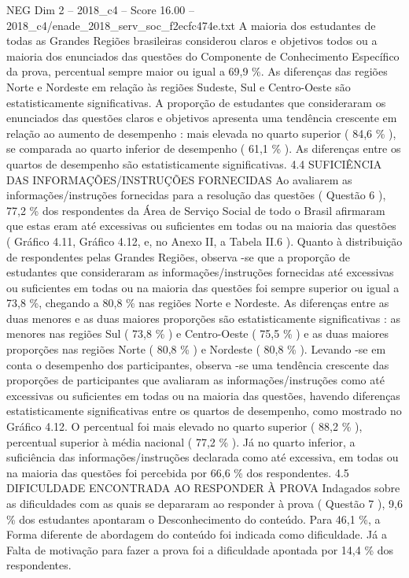 \begin{textsample}{NEG Dim 2 – 2018\_c4 – Score 16.00 – 2018\_c4/enade\_2018\_serv\_soc\_f2ecfc474e.txt}
A maioria dos estudantes de todas as Grandes Regiões brasileiras considerou claros e objetivos todos ou a maioria dos enunciados das questões do Componente de Conhecimento Específico da prova, percentual sempre maior ou igual a 69,9 \%.
As diferenças das regiões Norte e Nordeste em relação às regiões Sudeste, Sul e Centro-Oeste são estatisticamente significativas.
A proporção de estudantes que consideraram os enunciados das questões claros e objetivos apresenta uma tendência crescente em relação ao aumento de desempenho : mais elevada no quarto superior ( 84,6 \% ), se comparada ao quarto inferior de desempenho ( 61,1 \% ).
As diferenças entre os quartos de desempenho são estatisticamente significativas. 4.4 SUFICIÊNCIA DAS INFORMAÇÕES/INSTRUÇÕES FORNECIDAS Ao avaliarem as informações/instruções fornecidas para a resolução das questões ( Questão 6 ), 77,2 \% dos respondentes da Área de Serviço Social de todo o Brasil afirmaram que estas eram até excessivas ou suficientes em todas ou na maioria das questões ( Gráfico 4.11, Gráfico 4.12, e, no Anexo II, a Tabela II.6 ).
Quanto à distribuição de respondentes pelas Grandes Regiões, observa -se que a proporção de estudantes que consideraram as informações/instruções fornecidas até excessivas ou suficientes em todas ou na maioria das questões foi sempre superior ou igual a 73,8 \%, chegando a 80,8 \% nas regiões Norte e Nordeste.
As diferenças entre as duas menores e as duas maiores proporções são estatisticamente significativas : as menores nas regiões Sul ( 73,8 \% ) e Centro-Oeste ( 75,5 \% ) e as duas maiores proporções nas regiões Norte ( 80,8 \% ) e Nordeste ( 80,8 \% ).
Levando -se em conta o desempenho dos participantes, observa -se uma tendência crescente das proporções de participantes que avaliaram as informações/instruções como até excessivas ou suficientes em todas ou na maioria das questões, havendo diferenças estatisticamente significativas entre os quartos de desempenho, como mostrado no Gráfico 4.12.
O percentual foi mais elevado no quarto superior ( 88,2 \% ), percentual superior à média nacional ( 77,2 \% ).
Já no quarto inferior, a suficiência das informações/instruções declarada como até excessiva, em todas ou na maioria das questões foi percebida por 66,6 \% dos respondentes. 4.5 DIFICULDADE ENCONTRADA AO RESPONDER À PROVA Indagados sobre as dificuldades com as quais se depararam ao responder à prova ( Questão 7 ), 9,6 \% dos estudantes apontaram o Desconhecimento do conteúdo.
Para 46,1 \%, a Forma diferente de abordagem do conteúdo foi indicada como dificuldade.
Já a Falta de motivação para fazer a prova foi a dificuldade apontada por 14,4 \% dos respondentes.

\end{textsample}
